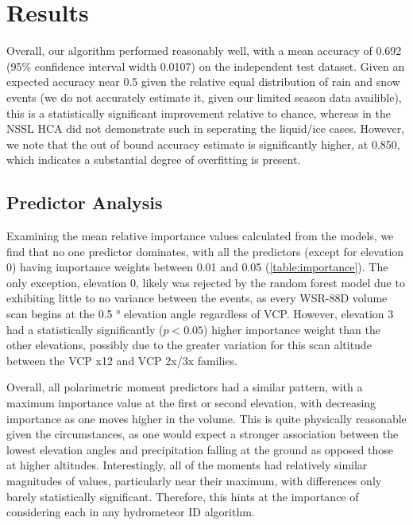 \documentclass{agujournal}
\begin{document}
\section{Results} \label{sec:results}

Overall, our algorithm performed reasonably well, with a mean accuracy of 0.692 (95\% confidence interval width 0.0107) on the independent test dataset. Given an expected accuracy near 0.5  given the relative equal distribution of rain and snow events (we do not accurately estimate it, given our limited season data availible), this is a statistically significant improvement relative to chance, whereas in \textcite{Elmore2011} the NSSL HCA did not demonstrate such in seperating the liquid/ice cases. However, we note that the out of bound accuracy estimate is significantly higher, at 0.850, which indicates a substantial degree of overfitting is present.


\subsection{Predictor Analysis}

Examining the mean relative importance values calculated from the models, we find that no one predictor dominates, with all the predictors (except for elevation 0) having importance weights between 0.01 and 0.05 (\ref{table:importance}). The only exception, elevation 0, likely was rejected by the random forest model due to exhibiting little to no variance between the events, as every WSR-88D volume scan begins at the 0.5 \si{\degree} elevation angle regardless of VCP. However, elevation 3 had a statistically significantly ($p < 0.05$) higher importance weight than the other elevations, possibly due to the greater variation for this scan altitude between the VCP x12 and VCP 2x/3x families.

Overall, all polarimetric moment predictors had a similar pattern, with a maximum importance value at the first or second elevation, with decreasing importance as one moves higher in the volume. This is quite physically reasonable given the circumstances, as one would expect a stronger association between the lowest elevation angles and precipitation falling at the ground as opposed those at higher altitudes. Interestingly, all of the moments had relatively similar magnitudes of values, particularly near their maximum, with differences only barely statistically significant. Therefore, this hints at the importance of considering each in any hydrometeor ID algorithm.
\end{document}
